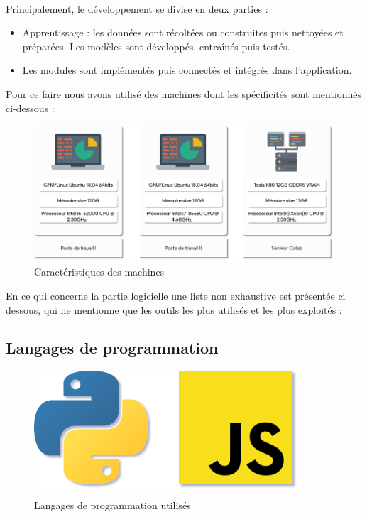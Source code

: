 	\paragraph{}
	Principalement, le développement se divise en deux parties : 
	\begin{itemize}
		\item Apprentissage : les données sont récoltées ou construites puis nettoyées et préparées. Les modèles sont développés, entraînés puis testés.
		\item Les modules sont implémentés puis connectés et intégrés dans l'application.
	\end{itemize}
	\par Pour ce faire nous avons utilisé des machines dont les spécificités sont mentionnés ci-dessous :
	\begin{figure}[H] 
		\centering
		\includegraphics[width=0.88\linewidth]{images/implementation/machines.png}
		\caption{Caractéristiques des machines}
		\label{fig:machines}
		
	\end{figure}
	\par
	En ce qui concerne la partie logicielle une liste non exhaustive est présentée ci dessous, qui ne mentionne que les outils les plus utilisés et les plus exploités :
	\subsection{Langages de programmation}
		\begin{figure}[H] 
		\centering
		\includegraphics[width=0.3\linewidth]{images/implementation/langs.png}
		\caption{Langages de programmation utilisés}
		\label{fig:langs}
	\end{figure}
